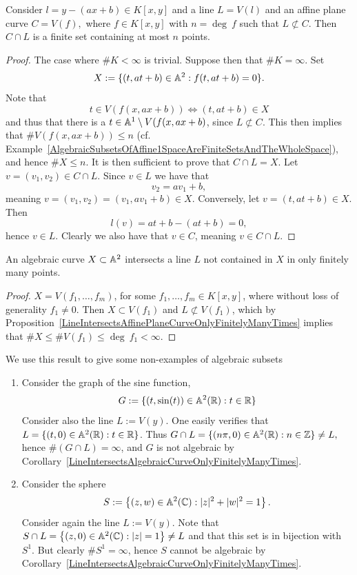 \begin{proposition}\label{LineIntersectsAffinePlaneCurveOnlyFinitelyManyTimes}
    Consider $l = y-(ax+b)\in K[x,y]$ and a line $L=V(l)$ and an affine plane curve $C =V(f),$ where $f\in K[x,y]$ with $n=\deg\ f$ such that $L\not\subset C$. Then $C\cap L$ is a finite set containing at most $n$ points.
\end{proposition}
\begin{proof}
    The case where $\#K < \infty$ is trivial. Suppose then that $\#K = \infty$.
    Set
    $$X := \{(t,at+b)\in \mathbb{A}^2 : f(t,at+b)=0\}.$$
    Note that 
    $$t \in V(f(x,ax+b)) \iff (t,at+b)\in X$$ 
    and thus that there is a $t \in \mathbb{A}^1\setminus V(f(x,ax+b)$, since $L\not\subset C$. This then implies that  $\#V(f(x,ax+b))\leq n$ (cf. Example~\ref{AlgebraicSubsetsOfAffine1SpaceAreFiniteSetsAndTheWholeSpace}), and hence $\#X \leq n$. It is then sufficient to prove that $C\cap L = X$. Let $v=(v_1,v_2)\in C\cap L$. Since $v\in L$ we have that 
    $$v_2 = av_1+b,$$
    meaning $v=(v_1,v_2)=(v_1,av_1+b)\in X$. Conversely, let $v=(t,at+b)\in X$. Then 
    $$l(v) = at+b-(at+b) = 0,$$
    hence $v\in L$. Clearly we also have that $v\in C$, meaning $v\in C\cap L$.
\end{proof}
\begin{corollary}\label{LineIntersectsAlgebraicCurveOnlyFinitelyManyTimes}
    An algebraic curve $X\subset \mathbb{A}^2$ intersects a line $L$ not contained in $X$ in only finitely many points.
\end{corollary}
\begin{proof}
    $X=V(f_1,\dots,f_m)$, for some $f_1,\dots,f_m\in K[x,y]$, where without loss of generality $f_1\neq 0$. Then $X\subset V(f_1)$ and $L \not\subset V(f_1)$, which by Proposition~\ref{LineIntersectsAffinePlaneCurveOnlyFinitelyManyTimes} implies that $\#X\leq \#V(f_1)\leq \deg\ f_1 <\infty$.
\end{proof}
We use this result to give some non-examples of algebraic subsets
\begin{example}
    \begin{enumerate}
        \item Consider the graph of the sine function,
        $$G := \{(t,\sin(t))\in \mathbb{A}^2(\mathbb{R}) : t\in \mathbb{R} \}$$
        Consider also the line $L:=V(y)$. One easily verifies that $L=\{(t,0)\in \mathbb{A}^2(\mathbb{R}) : t\in \mathbb{R}\}$. Thus $G\cap L = \{ (n\pi,0)\in \mathbb{A}^2(\mathbb{R}) : n\in \mathbb{Z}\} \neq L,$ hence $\#(G\cap L) = \infty$, and $G$ is not algebraic by Corollary~\ref{LineIntersectsAlgebraicCurveOnlyFinitelyManyTimes}.
        \item Consider the sphere
        $$S:=\left\{(z,w)\in \mathbb{A}^2(\mathbb{C}) : \vert z \vert^2+\vert w \vert^2 = 1 \right\}.$$
        Consider again the line $L:=V(y)$. Note that $S\cap L  = \left\{ (z,0) \in \mathbb{A}^2(\mathbb{C}) : \vert z\vert = 1 \right\} \neq L$ and that this set is in bijection with $S^1$. But clearly $\#S^1=\infty$, hence $S$ cannot be algebraic by Corollary~\ref{LineIntersectsAlgebraicCurveOnlyFinitelyManyTimes}.
    \end{enumerate}
\end{example}
